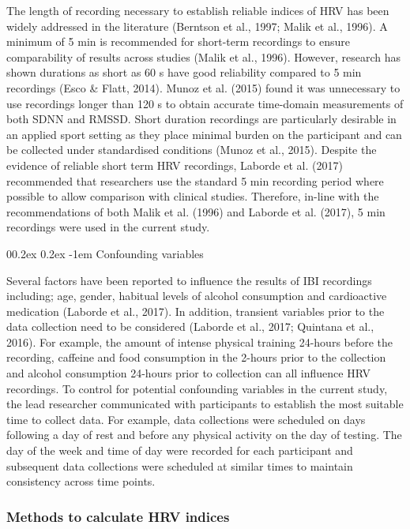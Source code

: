 \documentclass[
  english,
  man,floatsintext]{apa6}
\makeatletter
\renewcommand{\paragraph}{\@startsection{paragraph}{4}{\parindent}%
  {0\baselineskip \@plus 0.2ex \@minus 0.2ex}%
  {-1em}%
  {\normalfont\normalsize\bfseries\itshape\typesectitle}}
\makeatother
\begin{document}
The length of recording necessary to establish reliable indices of HRV has been widely addressed in the literature (Berntson et al., 1997; Malik et al., 1996).
A minimum of 5 min is recommended for short-term recordings to ensure comparability of results across studies (Malik et al., 1996).
However, research has shown durations as short as 60 s have good reliability compared to 5 min recordings (Esco \& Flatt, 2014).
Munoz et al. (2015) found it was unnecessary to use recordings longer than 120 s to obtain accurate time-domain measurements of both SDNN and RMSSD.
Short duration recordings are particularly desirable in an applied sport setting as they place minimal burden on the participant and can be collected under standardised conditions (Munoz et al., 2015).
Despite the evidence of reliable short term HRV recordings, Laborde et al. (2017) recommended that researchers use the standard 5 min recording period where possible to allow comparison with clinical studies.
Therefore, in-line with the recommendations of both Malik et al. (1996) and Laborde et al. (2017), 5 min recordings were used in the current study.

\hypertarget{confounding-variables}{%
\paragraph{Confounding variables}\label{confounding-variables}}

Several factors have been reported to influence the results of IBI recordings including; age, gender, habitual levels of alcohol consumption and cardioactive medication (Laborde et al., 2017).
In addition, transient variables prior to the data collection need to be considered (Laborde et al., 2017; Quintana et al., 2016).
For example, the amount of intense physical training 24-hours before the recording, caffeine and food consumption in the 2-hours prior to the collection and alcohol consumption 24-hours prior to collection can all influence HRV recordings.
To control for potential confounding variables in the current study, the lead researcher communicated with participants to establish the most suitable time to collect data.
For example, data collections were scheduled on days following a day of rest and before any physical activity on the day of testing.
The day of the week and time of day were recorded for each participant and subsequent data collections were scheduled at similar times to maintain consistency across time points.

\hypertarget{methods-to-calculate-hrv-indices}{%
\subsubsection{Methods to calculate HRV indices}\label{methods-to-calculate-hrv-indices}}
\end{document}
